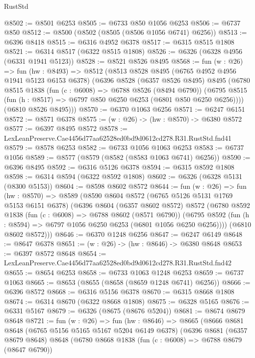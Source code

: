 \begin{lexlean}{RustStd}
\begin{coremodule}
@8502 := @8501 @6253
@8505 := @6733 @850 @1056 @6253
@8506 := @6737 @850
@8512 := @8500 (@8502 (@8505 (@8506 @1056 @6741) @6256))
@8513 := @6396 @8418
@8515 := @6316 @4952 @6378
@8517 := @6315 @8515 @1808
@8521 := @6314 @8517 (@6322 @8515 @1808)
@8526 := @6326 (@6328 @4956 (@6331 @1941 @5123))
@8528 := @8521 @8526 @8495
@8568 := fun (w : @26) =>
  fun (hw : @8493) =>
  @8512
    (@8513
      @8528
      @8495
      (@6765 @4952 @4956 @1941 @5123 @6153 @6378)
      (@6396
        @8528
        (@6357 @8526 @8495)
        @8495
        (@6780
          @8515
          @1838
          (fun (c : @6008) => @6788 @8526 (@8494 @6790))
          (@6795 @8515 (fun (h : @8517) => @6797 @850 @6250 @6253 (@6801 @850 @6250 @6256))))
        (@6810 @8526 @8495)))
@8570 := @6370 @1063 @6256
@8571 := @6247 @6151
@8572 := @8571 @6378
@8575 := (w : @26) -> (hw : @8570) -> @6380 @8572
@8577 := @6397 @8495 @8572
@8578 := LexLeanPreserve.Cae4456d77aa62528ed0bd9d0612cd278.R31.RustStd.fnd41
@8579 := @8578 @6253
@8582 := @6733 @1056 @1063 @6253
@8583 := @6737 @1056
@8589 := @8577 (@8579 (@8582 (@8583 @1063 @6741) @6256))
@8590 := @6396 @8495
@8592 := @6316 @5126 @6378
@8594 := @6315 @8592 @1808
@8598 := @6314 @8594 (@6322 @8592 @1808)
@8602 := @6326 (@6328 @5131 (@8300 @5153))
@8604 := @8598 @8602 @8572
@8644 := fun (w : @26) =>
  fun (hw : @8570) =>
  @8589
    (@8590
      @8604
      @8572
      (@6765 @5126 @5131 @1769 @5153 @6151 @6378)
      (@6396
        @8604
        (@6357 @8602 @8572)
        @8572
        (@6780
          @8592
          @1838
          (fun (c : @6008) => @6788 @8602 (@8571 @6790))
          (@6795 @8592 (fun (h : @8594) => @6797 @1056 @6250 @6253 (@6801 @1056 @6250 @6256))))
        (@6810 @8602 @8572)))
@8646 := @6370 @1248 @6256
@8647 := @6247 @6149
@8648 := @8647 @6378
@8651 := (w : @26) -> (hw : @8646) -> @6380 @8648
@8653 := @6397 @8572 @8648
@8654 := LexLeanPreserve.Cae4456d77aa62528ed0bd9d0612cd278.R31.RustStd.fnd42
@8655 := @8654 @6253
@8658 := @6733 @1063 @1248 @6253
@8659 := @6737 @1063
@8665 := @8653 (@8655 (@8658 (@8659 @1248 @6741) @6256))
@8666 := @6396 @8572
@8668 := @6316 @5156 @6378
@8670 := @6315 @8668 @1808
@8674 := @6314 @8670 (@6322 @8668 @1808)
@8675 := @6328 @5165
@8676 := @6331 @5167
@8679 := @6326 (@8675 (@8676 @5204))
@8681 := @8674 @8679 @8648
@8721 := fun (w : @26) =>
  fun (hw : @8646) =>
  @8665
    (@8666
      @8681
      @8648
      (@6765 @5156 @5165 @5167 @5204 @6149 @6378)
      (@6396
        @8681
        (@6357 @8679 @8648)
        @8648
        (@6780
          @8668
          @1838
          (fun (c : @6008) => @6788 @8679 (@8647 @6790))

\end{coremodule}
\end{lexlean}
